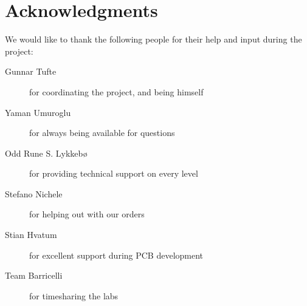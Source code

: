 \chapter*{Acknowledgments}
We would like to thank the following people for their help and input during the
project:

\begin{description}
  \item[Gunnar Tufte] for coordinating the project, and being himself
  \item[Yaman Umuroglu] for always being available for questions
  \item[Odd Rune S. Lykkebø] for providing technical support on every level
  \item[Stefano Nichele] for helping out with our orders
  \item[Stian Hvatum] for excellent support during PCB development
  \item[Team Barricelli] for timesharing the labs
\end{description}
